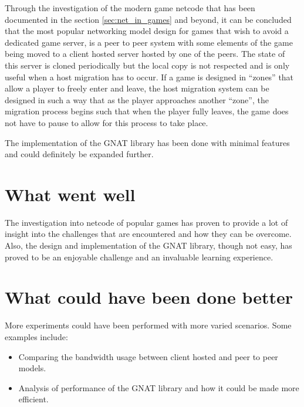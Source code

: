 Through the investigation of the modern game netcode that has been documented in the section \ref{sec:net_in_games} and beyond, it can be concluded that the most popular networking model design for games that wish to avoid a dedicated game server, is a peer to peer system with some elements of the game being moved to a client hosted server hosted by one of the peers. The state of this server is cloned periodically but the local copy is not respected and is only useful when a host migration has to occur. If a game is designed in ``zones'' that allow a player to freely enter and leave, the host migration system can be designed in such a way that as the player approaches another ``zone'', the migration process begins such that when the player fully leaves, the game does not have to pause to allow for this process to take place.

The implementation of the GNAT library has been done with minimal features and could definitely be expanded further.


\section{What went well}
The investigation into netcode of popular games has proven to provide a lot of insight into the challenges that are encountered and how they can be overcome. Also, the design and implementation of the GNAT library, though not easy, has proved to be an enjoyable challenge and an invaluable learning experience.


\section{What could have been done better}
More experiments could have been performed with more varied scenarios. Some examples include:
\begin{itemize}
\item Comparing the bandwidth usage between client hosted and peer to peer models.
\item Analysis of performance of the GNAT library and how it could be made more efficient.
\end{itemize}


